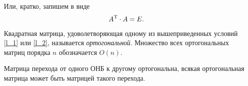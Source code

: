 Или, кратко, запишем в виде
\begin{equation}
\label{l_2}
    A^{\text{T}} \cdot A = E.
\end{equation}

\begin{to_def} 
    Квадратная матрица, удоволетворяющая одному из вышеприведенных условий  \eqref{l_1} или \eqref{l_2}, называется \textit{ортогональной}. Множество всех ортогональных матриц порядка $n$ обозначается $O(n)$. 
\end{to_def}

\begin{to_thr} 
    Матрица перехода от одного ОНБ к другому ортогональна, всякая ортогональная матрица может быть матрицей такого перехода. 
\end{to_thr}





